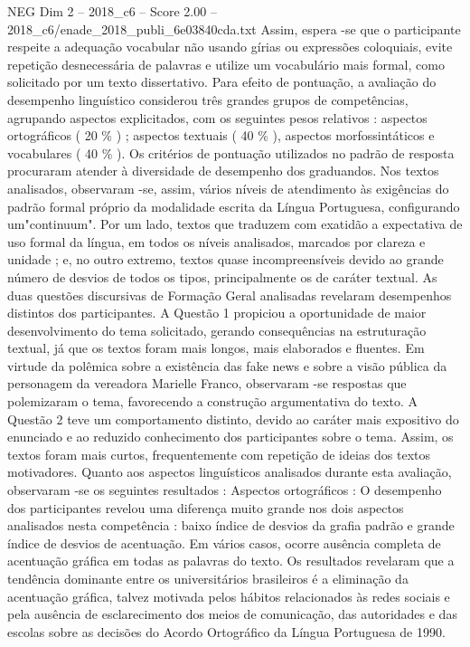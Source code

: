 \begin{textsample}{NEG Dim 2 – 2018\_c6 – Score 2.00 – 2018\_c6/enade\_2018\_publi\_6e03840cda.txt}
Assim, espera -se que o participante respeite a adequação vocabular não usando gírias ou expressões coloquiais, evite repetição desnecessária de palavras e utilize um vocabulário mais formal, como solicitado por um texto dissertativo.
Para efeito de pontuação, a avaliação do desempenho linguístico considerou três grandes grupos de competências, agrupando aspectos explicitados, com os seguintes pesos relativos : aspectos ortográficos ( 20 \% ) ; aspectos textuais ( 40 \% ), aspectos morfossintáticos e vocabulares ( 40 \% ).
Os critérios de pontuação utilizados no padrão de resposta procuraram atender à diversidade de desempenho dos graduandos.
Nos textos analisados, observaram -se, assim, vários níveis de atendimento às exigências do padrão formal próprio da modalidade escrita da Língua Portuguesa, configurando um"continuum".
Por um lado, textos que traduzem com exatidão a expectativa de uso formal da língua, em todos os níveis analisados, marcados por clareza e unidade ; e, no outro extremo, textos quase incompreensíveis devido ao grande número de desvios de todos os tipos, principalmente os de caráter textual.
As duas questões discursivas de Formação Geral analisadas revelaram desempenhos distintos dos participantes.
A Questão 1 propiciou a oportunidade de maior desenvolvimento do tema solicitado, gerando consequências na estruturação textual, já que os textos foram mais longos, mais elaborados e fluentes.
Em virtude da polêmica sobre a existência das fake news e sobre a visão pública da personagem da vereadora Marielle Franco, observaram -se respostas que polemizaram o tema, favorecendo a construção argumentativa do texto.
A Questão 2 teve um comportamento distinto, devido ao caráter mais expositivo do enunciado e ao reduzido conhecimento dos participantes sobre o tema.
Assim, os textos foram mais curtos, frequentemente com repetição de ideias dos textos motivadores.
Quanto aos aspectos linguísticos analisados durante esta avaliação, observaram -se os seguintes resultados : Aspectos ortográficos : O desempenho dos participantes revelou uma diferença muito grande nos dois aspectos analisados nesta competência : baixo índice de desvios da grafia padrão e grande índice de desvios de acentuação.
Em vários casos, ocorre ausência completa de acentuação gráfica em todas as palavras do texto.
Os resultados revelaram que a tendência dominante entre os universitários brasileiros é a eliminação da acentuação gráfica, talvez motivada pelos hábitos relacionados às redes sociais e pela ausência de esclarecimento dos meios de comunicação, das autoridades e das escolas sobre as decisões do Acordo Ortográfico da Língua Portuguesa de 1990.

\end{textsample}
